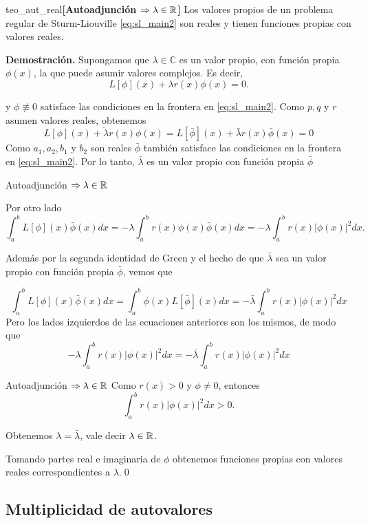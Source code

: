 \begin{teorema}{teo_aut_real}{\textbf{[Autoadjunción $\Rightarrow \lambda\in\mathbb{R}$]}} Los valores propios de un problema regular de Sturm-Liouville \eqref{eq:sl_main2}  son reales y tienen funciones propias con valores reales.
 
\end{teorema}


\textbf{Demostración.} Supongamos que $\lambda\in \mathbb{C}$ es un valor propio, con función propia $\phi(x)$, la que puede asumir valores complejos. Es decir,
$$L[\phi](x)+\lambda r(x) \phi(x)=0.$$

y $\phi\not\equiv 0$ satisface las condiciones en la frontera en  \eqref{eq:sl_main2}. Como $p, q$ y $r$ asumen valores reales, obtenemos
$$\overline{L[\phi](x)+\lambda r(x) \phi(x)}=L[\bar{\phi}](x)+\bar{\lambda} r(x) \bar{\phi}(x)=0$$
Como $a_{1}, a_{2}, b_{1}$ y $b_{2}$ son reales $\bar{\phi}$ también satisface las condiciones en la frontera en \eqref{eq:sl_main2}. Por lo tanto, $\bar{\lambda}$ es un valor propio con función propia $\bar{\phi}$




{Autoadjunción $\Rightarrow \lambda\in\mathbb{R}$}

Por otro lado
$$\int_{a}^{b} L[\phi](x) \bar{\phi}(x) d x=-\lambda \int_{a}^{b} r(x) \phi(x) \bar{\phi}(x) d x=-\lambda \int_{a}^{b} r(x)|\phi(x)|^{2} d x.$$


Además por la segunda identidad de Green y el hecho de que $\bar{\lambda}$ sea un valor propio con función propia $\bar{\phi}$, vemos que


$$
\int_{a}^{b} L[\phi](x) \bar{\phi}(x) d x=\int_{a}^{b} \phi(x) L[\bar{\phi}](x) d x=-\bar{\lambda} \int_{a}^{b} r(x)|\phi(x)|^{2} d x
$$
Pero los lados izquierdos de las ecuaciones anteriores son los mismos, de modo que 
$$
-\lambda \int_{a}^{b} r(x)|\phi(x)|^{2} d x=-\bar{\lambda} \int_{a}^{b} r(x)|\phi(x)|^{2} d x
$$




{Autoadjunción $\Rightarrow \lambda\in\mathbb{R}$}
Como $r(x)>0$ y $\phi\neq 0$, entonces 
$$\int_{a}^{b} r(x)|\phi(x)|^{2} d x>0.$$ 

Obtenemos $\lambda=\bar{\lambda}$, vale decir $\lambda\in\mathbb{R}$. 

Tomando partes real e imaginaria de  $\phi$ obtenemos  funciones propias con valores reales correspondientes a $\lambda$.\qed 


\subsection{Multiplicidad de autovalores}

